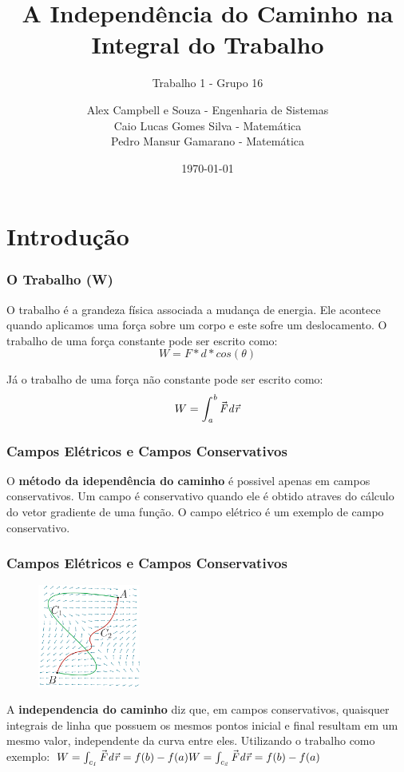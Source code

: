 \documentclass{beamer}
\title{A Independência do Caminho na Integral do Trabalho}
\subtitle{Trabalho 1 - Grupo 16}
\author [Alex, Caio, Pedro]{
    \small Alex Campbell e Souza - Engenharia de Sistemas \\ 
    Caio Lucas Gomes Silva - Matemática \\ 
    Pedro Mansur Gamarano - Matemática
}
\institute[]{
    \large UFMG \\
    \footnotesize Universidade Federal de Minas Gerais \\
    \small Fundamentos de Eletromagnetismo
}
\date{\today}
\def\vec{\mathaccent "017E\relax }
\begin{document}
\frame{\titlepage}

\frame{\tableofcontents}

\section{Introdução}
\begin{frame}
    \frametitle{O Trabalho (W)}
    
    O trabalho é a grandeza física associada a mudança de energia. 
    Ele acontece quando aplicamos uma força sobre um corpo e este sofre um deslocamento. 
    O trabalho de uma força constante pode ser escrito como: 
    \begin{equation}\label{eq:trabalho-constante}
    W = F * d * cos(\theta)
    \end{equation}

    Já o trabalho de uma força não constante pode ser escrito como: 
    \begin{equation}\label{trabalho-nao-constante}
    W = \mathit{\int_{a}^b \vec{F} d\vec{r}}
    \end{equation}

\end{frame}

\begin{frame}
    \frametitle{Campos Elétricos e Campos Conservativos}
    
    O \textbf{método da idependência do caminho} é possivel apenas em campos conservativos. 
    Um campo é conservativo quando ele é obtido atraves do cálculo do vetor gradiente de uma função. 
    O campo elétrico é um exemplo de campo conservativo.

\end{frame}

\begin{frame}
    \frametitle{Campos Elétricos e Campos Conservativos}
    
    
    \begin{figure} 
        \vspace{-35pt}
        \centering
        \caption{}
        \includegraphics[width=0.30\textwidth]{grafico-trabalho.png}
        \label{fig:grafico-trabalho}
    \end{figure}
    
    A \textbf{independencia do caminho} diz que, em campos conservativos, quaisquer integrais de 
    linha que possuem os mesmos pontos inicial e final resultam em um mesmo valor, independente da curva entre eles. 
    Utilizando o trabalho como exemplo:  
    \hfill \break
    \hfill \break
    $    
        W = \mathit{\int_{c_1} \vec{F} d\vec{r}} = f(b) - f(a) 
        \hfill \break
        W = \mathit{\int_{c_2} \vec{F} d\vec{r}} = f(b) - f(a) 
    $

\end{frame}
\end{document}
